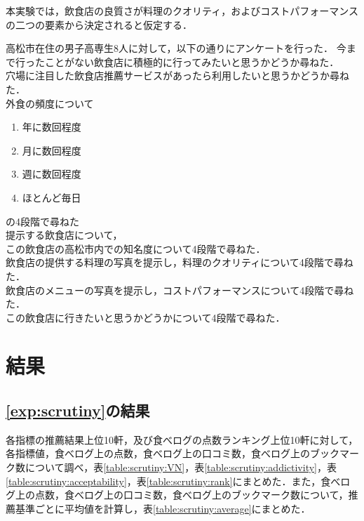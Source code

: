 		本実験では，飲食店の良質さが料理のクオリティ，およびコストパフォーマンスの二つの要素から決定されると仮定する．\par
		高松市在住の男子高専生8人に対して，以下の通りにアンケートを行った．%
		今まで行ったことがない飲食店に積極的に行ってみたいと思うかどうか尋ねた．\\
		穴場に注目した飲食店推薦サービスがあったら利用したいと思うかどうか尋ねた．\\
		外食の頻度について
		\begin{enumerate}
			\item 年に数回程度
			\item 月に数回程度
			\item 週に数回程度
			\item ほとんど毎日
		\end{enumerate}
		の4段階で尋ねた\\
		提示する飲食店について，\\
		この飲食店の高松市内での知名度について4段階で尋ねた．\\
		飲食店の提供する料理の写真を提示し，料理のクオリティについて4段階で尋ねた．\\
		飲食店のメニューの写真を提示し，コストパフォーマンスについて4段階で尋ねた．\\
		この飲食店に行きたいと思うかどうかについて4段階で尋ねた．\\
\section{結果}
	\subsection{\ref{exp:scrutiny}の結果}
	各指標の推薦結果上位10軒，及び食べログの点数ランキング上位10軒に対して，各指標値，食べログ上の点数，食べログ上の口コミ数，食べログ上のブックマーク数について調べ，表\ref{table:scrutiny:VN}，表\ref{table:scrutiny:addictivity}，表\ref{table:scrutiny:acceptability}，表\ref{table:scrutiny:rank}にまとめた．また，食べログ上の点数，食べログ上の口コミ数，食べログ上のブックマーク数について，推薦基準ごとに平均値を計算し，表\ref{table:scrutiny:average}にまとめた．
	
	
	
	
	
	\newpage

